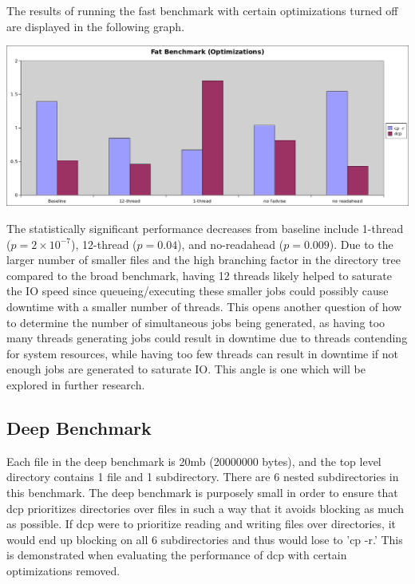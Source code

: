 \documentclass[12pt]{article}
\begin{document}
The results of running the fast benchmark with certain optimizations turned
off are displayed in the following graph.\\

\vspace{5mm}

\includegraphics[width=500pt]{report/graphs/fat-optimizations.png}

\vspace{5mm}

The statistically significant performance decreases from baseline
include 1-thread ($p = 2 \times 10^{-7}$), 12-thread ($p = 0.04$), and no-readahead ($p = 0.009$).
Due to the larger number of smaller files and the high branching factor in the directory tree compared
to the broad benchmark, having 12 threads likely helped to saturate the IO speed since queueing/executing
these smaller jobs could possibly cause downtime with a smaller number of threads. This opens another question
of how to determine the number of simultaneous jobs being generated, as having too many threads generating jobs
could result in downtime due to threads contending for system resources, while having too few threads can
result in downtime if not enough jobs are generated to saturate IO. This angle is one which will be
explored in further research. \\

\subsection{Deep Benchmark}
Each file in the deep benchmark is 20mb (20000000 bytes), and
the top level directory contains 1 file and 1 subdirectory. There
are 6 nested subdirectories in this benchmark.
The deep benchmark is purposely small in order to ensure that dcp prioritizes
directories over files in such a way that it avoids blocking as much as possible.
If dcp were to prioritize reading and writing files over directories, it would end up
blocking on all 6 subdirectories and thus would lose to 'cp -r.' This is demonstrated
when evaluating the performance of dcp with certain optimizations removed. \\
\end{document}
